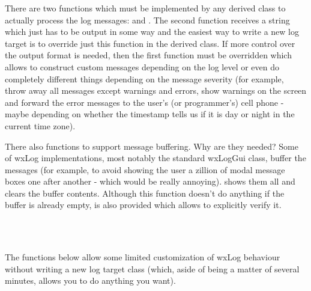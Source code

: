 \\
\\
\\
\\
\\


There are two functions which must be implemented by any derived class to
actually process the log messages:  and
. The second function receives a string
which just has to be output in some way and the easiest way to write a new log
target is to override just this function in the derived class. If more control
over the output format is needed, then the first function must be overridden
which allows to construct custom messages depending on the log level or even
do completely different things depending on the message severity (for example,
throw away all messages except warnings and errors, show warnings on the
screen and forward the error messages to the user's (or programmer's) cell
phone - maybe depending on whether the timestamp tells us if it is day or
night in the current time zone).

There also functions to support message buffering. Why are they needed?
Some of wxLog implementations, most notably the standard wxLogGui class,
buffer the messages (for example, to avoid showing the user a zillion of modal
message boxes one after another - which would be really annoying).
 shows them all and clears the buffer contents.
Although this function doesn't do anything if the buffer is already empty,
 is also provided which
allows to explicitly verify it.

\\
\\

\label{wxlogcustomization}

The functions below allow some limited customization of wxLog behaviour
without writing a new log target class (which, aside of being a matter of
several minutes, allows you to do anything you want).

